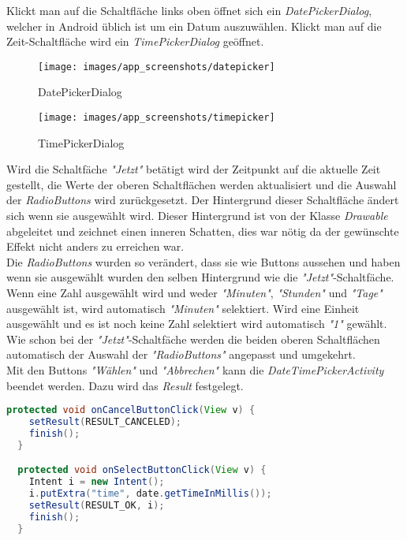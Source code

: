Klickt man auf die Schaltfläche links oben öffnet sich ein \textit{DatePickerDialog}, welcher in Android üblich ist um ein Datum auszuwählen. Klickt man auf die Zeit-Schaltfläche wird ein \textit{TimePickerDialog} geöffnet.
\begin{figure}[H]
  \centering
  \begin{minipage}[t]{7 cm}
  	\centering
  	\texttt{[image: images/app\_screenshots/datepicker]} 
    \caption{DatePickerDialog}
  \end{minipage}
  \hspace{0.5cm}
  \begin{minipage}[t]{7 cm}
	\centering
	\texttt{[image: images/app\_screenshots/timepicker]}  
    \caption{TimePickerDialog}
  \end{minipage}
\end{figure}
Wird die Schaltfäche \textit{"Jetzt"} betätigt wird der Zeitpunkt auf die aktuelle Zeit gestellt, die Werte der oberen Schaltflächen werden aktualisiert und die Auswahl der \textit{RadioButtons} wird zurückgesetzt. Der Hintergrund dieser Schaltfläche ändert sich wenn sie ausgewählt wird. Dieser Hintergrund ist von der Klasse \textit{Drawable} abgeleitet und zeichnet einen inneren Schatten, dies war nötig da der gewünschte Effekt nicht anders zu erreichen war.\\
Die \textit{RadioButtons} wurden so verändert, dass sie wie Buttons aussehen und haben wenn sie ausgewählt wurden den selben Hintergrund wie die \textit{"Jetzt"}-Schaltfäche. Wenn eine Zahl ausgewählt wird und weder \textit{"Minuten"}, \textit{"Stunden"} und \textit{"Tage"} ausgewählt ist, wird automatisch \textit{"Minuten"} selektiert. Wird eine Einheit ausgewählt und es ist noch keine Zahl selektiert wird automatisch \textit{"1"} gewählt. Wie schon bei der \textit{"Jetzt"}-Schaltfäche werden die beiden oberen Schaltflächen automatisch der Auswahl der \textit{"RadioButtons"} angepasst und umgekehrt.\\
Mit den Buttons \textit{"Wählen"} und \textit{"Abbrechen"} kann die \textit{DateTimePickerActivity} beendet werden. Dazu wird das \textit{Result} festgelegt.
\begin{lstlisting}[language=java, captionpos=b, caption={Setzen des ActivityResults}]
  protected void onCancelButtonClick(View v) {
    setResult(RESULT_CANCELED);
    finish();
  }

  protected void onSelectButtonClick(View v) {
    Intent i = new Intent();
    i.putExtra("time", date.getTimeInMillis());
    setResult(RESULT_OK, i);
    finish();
  }
\end{lstlisting}
